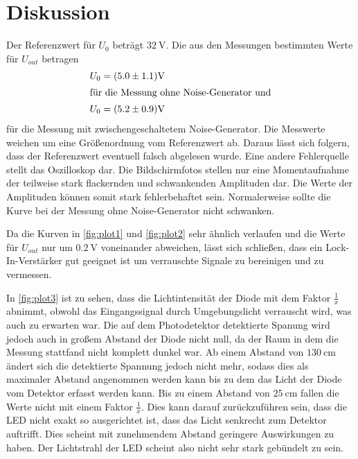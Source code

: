 \section{Diskussion}
\label{sec:Diskussion}

Der Referenzwert für $U_{0}$ beträgt $\qty{32}{\volt}$.
Die aus den Messungen bestimmten Werte für $U_{out}$ betragen
\begin{align*}
    U_{0} &= (5.0 \pm 1.1) \si{\volt}\\
    \intertext{für die Messung ohne Noise-Generator und}
    U_{0} &= (5.2 \pm 0.9) \si{\volt}
\end{align*}
für die Messung mit zwischengeschaltetem Noise-Generator.
Die Messwerte weichen um eine Größenordnung vom Referenzwert ab. Daraus lässt sich folgern, dass der Referenzwert eventuell falsch abgelesen wurde.
Eine andere Fehlerquelle stellt das Oszilloskop dar. Die Bildschirmfotos stellen nur eine Momentaufnahme der teilweise stark flackernden und schwankenden 
Amplituden dar. Die Werte der Amplituden können somit stark fehlerbehaftet sein. Normalerweise sollte die Kurve bei der Messung ohne Noise-Generator nicht
schwanken.

Da die Kurven in \autoref{fig:plot1} und \autoref{fig:plot2} sehr ähnlich verlaufen und die Werte für $U_{out}$ nur um $\qty{0.2}{\volt}$ voneinander abweichen,
lässt sich schließen, dass ein Lock-In-Verstärker gut geeignet ist um verrauschte Signale zu bereinigen und zu vermessen.


In \autoref{fig:plot3} ist zu sehen, dass die Lichtintensität der Diode mit dem Faktor $\frac{1}{x}$ abnimmt, obwohl das Eingangssignal durch Umgebungslicht verrauscht wird, was auch zu erwarten war.
Die auf dem Photodetektor detektierte Spanung wird jedoch auch in großem Abstand der Diode nicht null, da der Raum in dem die Messung stattfand nicht komplett dunkel war.
Ab einem Abstand von $\qty{130}{\centi\meter}$ ändert sich die detektierte Spannung jedoch nicht mehr, sodass dies als maximaler Abstand angenommen werden kann
bis zu dem das Licht der Diode vom Detektor erfasst werden kann.
Bis zu einem Abstand von $\qty{25}{\centi\meter}$ fallen die Werte nicht mit einem Faktor $\frac{1}{x}$. Dies kann darauf zurückzuführen sein,
dass die LED nicht exakt so ausgerichtet ist, dass das Licht senkrecht zum Detektor auftrifft. Dies scheint mit zunehmendem Abstand geringere Auswirkungen
zu haben. Der Lichtstrahl der LED scheint also nicht sehr stark gebündelt zu sein.
